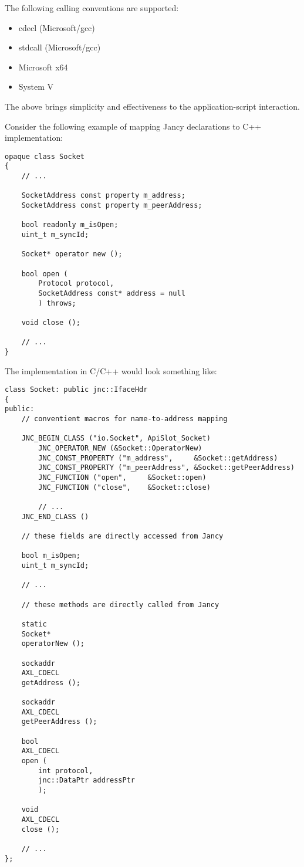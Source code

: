 \documentclass[oneside]{book}
\begin{document}
The following calling conventions are supported:

\begin{itemize}
\item cdecl (Microsoft/gcc)
\item stdcall (Microsoft/gcc)
\item Microsoft x64
\item System V
\end{itemize}

The above brings simplicity and effectiveness to the application-script interaction.

Consider the following example of mapping Jancy declarations to C++ implementation:

\begin{lstlisting}
opaque class Socket
{
    // ...

    SocketAddress const property m_address;
    SocketAddress const property m_peerAddress;

    bool readonly m_isOpen;
    uint_t m_syncId;

    Socket* operator new ();

    bool open (
        Protocol protocol,
        SocketAddress const* address = null
        ) throws;

    void close ();

    // ...
}
\end{lstlisting}

The implementation in C/C++ would look something like:

\begin{lstlisting}
class Socket: public jnc::IfaceHdr
{
public:
    // conventient macros for name-to-address mapping

    JNC_BEGIN_CLASS ("io.Socket", ApiSlot_Socket)
        JNC_OPERATOR_NEW (&Socket::OperatorNew)
        JNC_CONST_PROPERTY ("m_address",     &Socket::getAddress)
        JNC_CONST_PROPERTY ("m_peerAddress", &Socket::getPeerAddress)
        JNC_FUNCTION ("open",     &Socket::open)
        JNC_FUNCTION ("close",    &Socket::close)

        // ...
    JNC_END_CLASS ()

    // these fields are directly accessed from Jancy

    bool m_isOpen;
    uint_t m_syncId;

    // ...

    // these methods are directly called from Jancy

    static
    Socket*
    operatorNew ();

    sockaddr
    AXL_CDECL
    getAddress ();

    sockaddr
    AXL_CDECL
    getPeerAddress ();

    bool
    AXL_CDECL
    open (
        int protocol,
        jnc::DataPtr addressPtr
        );

    void
    AXL_CDECL
    close ();

    // ...
};
\end{lstlisting}
\end{document}
